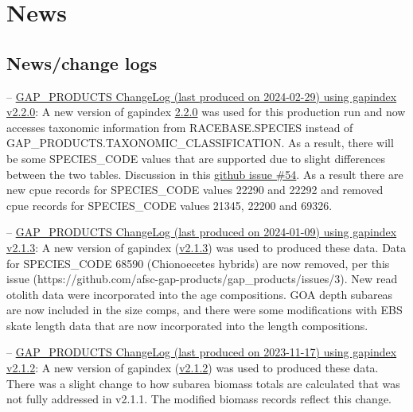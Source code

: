 \documentclass[
  letterpaper,
  oneside,
  open=any]{scrbook}
\begin{document}
\hypertarget{news}{%
\chapter{News}\label{news}}

\hypertarget{newschange-logs}{%
\section{News/change logs}\label{newschange-logs}}

--
\href{https://raw.githubusercontent.com/afsc-gap-products/gap_products/main/content/intro-news/2024-02-29.txt}{GAP\_PRODUCTS
ChangeLog (last produced on 2024-02-29) using gapindex v2.2.0}: A new
version of gapindex
\href{https://github.com/afsc-gap-products/gapindex/releases/tag/v2.2.0}{2.2.0}
was used for this production run and now accesses taxonomic information
from RACEBASE.SPECIES instead of
GAP\_PRODUCTS.TAXONOMIC\_CLASSIFICATION. As a result, there will be some
SPECIES\_CODE values that are supported due to slight differences
between the two tables. Discussion in this
\href{https://github.com/afsc-gap-products/gapindex/issues/54}{github
issue \#54}. As a result there are new cpue records for SPECIES\_CODE
values 22290 and 22292 and removed cpue records for SPECIES\_CODE values
21345, 22200 and 69326.

--
\href{https://raw.githubusercontent.com/afsc-gap-products/gap_products/main/content/intro-news/2024-01-09.txt}{GAP\_PRODUCTS
ChangeLog (last produced on 2024-01-09) using gapindex v2.1.3}: A new
version of gapindex
(\href{https://github.com/afsc-gap-products/gapindex/releases/tag/v2.1.3}{v2.1.3})
was used to produced these data. Data for SPECIES\_CODE 68590
(Chionoecetes hybrids) are now removed, per this issue
(https://github.com/afsc-gap-products/gap\_products/issues/3). New read
otolith data were incorporated into the age compositions. GOA depth
subareas are now included in the size comps, and there were some
modifications with EBS skate length data that are now incorporated into
the length compositions.

--
\href{https://raw.githubusercontent.com/afsc-gap-products/gap_products/main/content/intro-news/2023-11-17.txt}{GAP\_PRODUCTS
ChangeLog (last produced on 2023-11-17) using gapindex v2.1.2}: A new
version of gapindex
(\href{https://github.com/afsc-gap-products/gapindex/releases/tag/v2.1.2}{v2.1.2})
was used to produced these data. There was a slight change to how
subarea biomass totals are calculated that was not fully addressed in
v2.1.1. The modified biomass records reflect this change.
\end{document}
